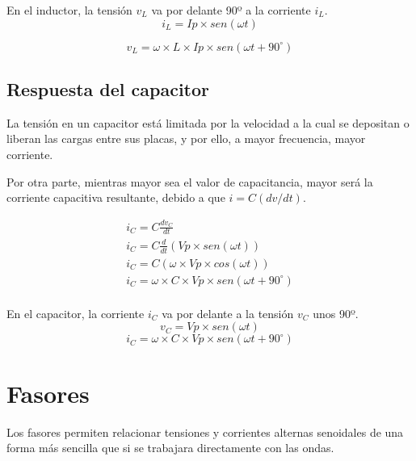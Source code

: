 \begin{conclusiones}
	En el inductor, la tensión $v_L$ va por delante 90º a la corriente $i_L$. 
	\begin{equation}
		\label{eq:i_inductor}
		i_L = Ip\times sen(\omega t)
	\end{equation}
	
	\begin{equation}
		\label{eq:v_inductor}
		v_L = \omega \times L \times Ip \times sen(\omega t + 90^{\circ})
	\end{equation}
	
\end{conclusiones}

\subsection{Respuesta del capacitor}

La tensión en un capacitor está limitada por la velocidad a la cual se depositan o liberan las cargas entre sus placas, y por ello, a mayor frecuencia, mayor corriente.

Por otra parte, mientras mayor sea el valor de capacitancia, mayor será la corriente capacitiva resultante, debido a que $i = C(dv/dt)$.

\begin{eqnarray*}
	i_C = C \frac{dv_C}{dt} \\
	i_C = C \frac{d}{dt}(Vp\times sen(\omega t)) \\
	i_C = C (\omega \times Vp \times cos(\omega t)) \\
	i_C = \omega \times C \times Vp \times sen(\omega t + 90^{\circ}) \\
\end{eqnarray*}

\begin{conclusiones}
	En el capacitor, la corriente $i_C$ va por delante a la tensión $v_C$ unos 90º. 
	\begin{equation}
		\label{eq:v_capacitor}
		v_C = Vp\times sen(\omega t)
	\end{equation}
	\begin{equation}
		\label{eq:i_capacitor}
		i_C = \omega \times C \times Vp \times sen(\omega t + 90^{\circ})
	\end{equation}
\end{conclusiones}

\section{Fasores}
Los fasores permiten relacionar tensiones y corrientes alternas senoidales de una forma más sencilla que si se trabajara directamente con las ondas.

